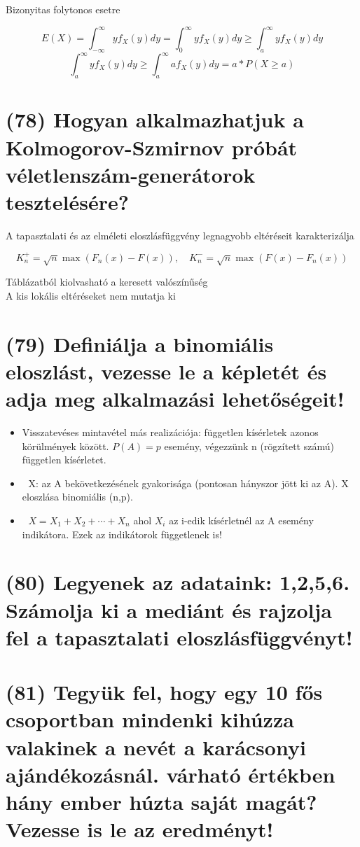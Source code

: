 \documentclass[12p]{article}
\begin{document}
Bizonyitas folytonos esetre

$$E(X) = \int_{-\infty}^{\infty} yf_X(y)dy = \int_{0}^{\infty} yf_X(y)dy \geq \int_{a}^{\infty} yf_X(y)dy$$
$$\int_{a}^{\infty}yf_X(y)dy \geq \int_{a}^{\infty} af_X(y)dy = a * P(X \geq a)$$

\section{(78) Hogyan alkalmazhatjuk a Kolmogorov-Szmirnov próbát véletlenszám-generátorok tesztelésére?}

A tapasztalati és az elméleti eloszlásfüggvény
legnagyobb eltéréseit karakterizálja

$$K_n^{+} = \sqrt{n} \max (F_n(x) - F(x)), \quad K_n^{-}=\sqrt{n} \max(F(x) - F_n(x))$$

Táblázatból kiolvasható a keresett valószínűség\\
A kis lokális eltéréseket nem mutatja ki

\section{(79) Definiálja a binomiális eloszlást, vezesse le a képletét és adja meg alkalmazási lehetőségeit!}

\begin{itemize}
\item Visszatevéses mintavétel más realizációja:
független kísérletek azonos körülmények
között. $P(A) = p$ esemény, végezzünk n
(rögzített számú) független kísérletet.
\item X: az A bekövetkezésének gyakorisága (pontosan hányszor jött ki az A). X eloszlása binomiális (n,p).
\item $X = X_1 + X_2 + \cdots + X_n$ ahol $X_i$ az i-edik kísérletnél
az A esemény indikátora. Ezek az indikátorok függetlenek is!

\end{itemize}

\section{(80) Legyenek az adataink: 1,2,5,6. Számolja ki a mediánt és rajzolja fel a tapasztalati eloszlásfüggvényt!}

\section{(81) Tegyük fel, hogy egy 10 fős csoportban mindenki kihúzza valakinek a nevét a karácsonyi ajándékozásnál. várható értékben hány ember húzta saját magát? Vezesse is le az eredményt!}
\end{document}

